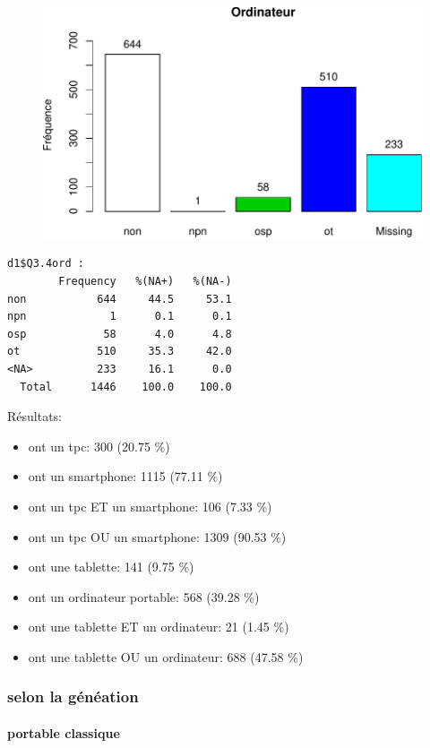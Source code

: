\documentclass[]{article}
\begin{document}
\begin{figure}[htbp]
\centering
\includegraphics{qs_etudiants_files/figure-latex/outils-4.pdf}
\end{figure}

\begin{verbatim}
d1$Q3.4ord : 
        Frequency   %(NA+)   %(NA-)
non           644     44.5     53.1
npn             1      0.1      0.1
osp            58      4.0      4.8
ot            510     35.3     42.0
<NA>          233     16.1      0.0
  Total      1446    100.0    100.0
\end{verbatim}

Résultats:

\begin{itemize}
\item
  ont un tpc: 300 (20.75 \%)
\item
  ont un smartphone: 1115 (77.11 \%)
\item
  ont un tpc ET un smartphone: 106 (7.33 \%)
\item
  ont un tpc OU un smartphone: 1309 (90.53 \%)
\item
  ont une tablette: 141 (9.75 \%)
\item
  ont un ordinateur portable: 568 (39.28 \%)
\item
  ont une tablette ET un ordinateur: 21 (1.45 \%)
\item
  ont une tablette OU un ordinateur: 688 (47.58 \%)
\end{itemize}

\subsubsection{selon la généation}\label{selon-la-geneation}

\paragraph{portable classique}\label{portable-classique}
\end{document}
